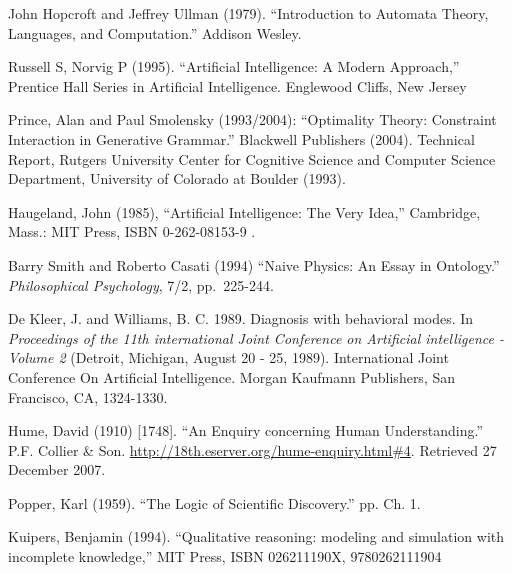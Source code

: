 \documentclass{article} %
\begin{document}
\begin{thebibliography}{99}
	John Hopcroft and Jeffrey Ullman (1979). 
	``Introduction to Automata Theory, Languages, and Computation.'' Addison Wesley.

	Russell S, Norvig P (1995). 
	``Artificial Intelligence: A Modern Approach,'' 
	Prentice Hall Series in Artificial Intelligence. Englewood Cliffs, New Jersey

	Prince, Alan and Paul Smolensky (1993/2004): 
	``Optimality Theory: Constraint Interaction in Generative Grammar.''
	Blackwell Publishers (2004). Technical Report, Rutgers
	University Center for Cognitive Science and Computer Science
	Department, University of Colorado at Boulder (1993).

	Haugeland, John (1985), 
	``Artificial Intelligence: The Very Idea,''
	Cambridge, Mass.: MIT Press, ISBN 0-262-08153-9 .

	Barry Smith and Roberto Casati (1994)
	``Naive Physics: An Essay in Ontology.''
	{\em Philosophical Psychology}, 7/2, pp.\ 225-244.

	De Kleer, J. and Williams, B. C. 1989. Diagnosis with behavioral modes.
	In \emph{Proceedings of the 11th international Joint Conference on Artificial
	intelligence - Volume 2} (Detroit, Michigan, August 20 - 25, 1989).
	International Joint Conference On Artificial Intelligence. Morgan
	Kaufmann Publishers, San Francisco, CA, 1324-1330. 

	Hume, David (1910) [1748]. 
	``An Enquiry concerning Human Understanding.''
	P.F. Collier \& Son. 
	\url{http://18th.eserver.org/hume-enquiry.html#4}. 
	Retrieved 27 December 2007.

	Popper, Karl (1959). 
	``The Logic of Scientific Discovery.'' pp. Ch. 1. 

	Kuipers, Benjamin (1994). ``Qualitative reasoning: modeling and simulation with incomplete knowledge,''
	MIT Press, ISBN	026211190X, 9780262111904

\end{thebibliography}
\end{document}

